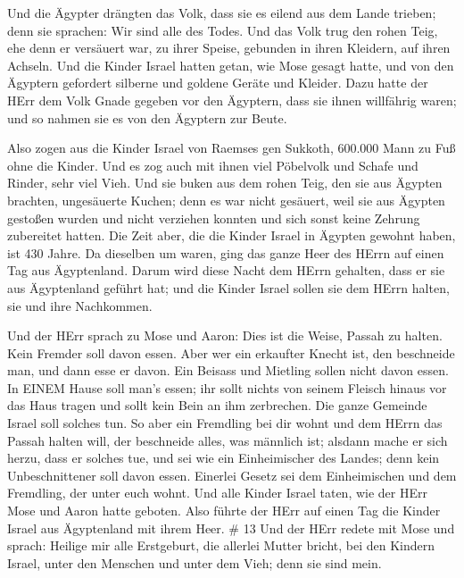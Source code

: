  Und die Ägypter drängten das Volk, dass sie es eilend aus
dem Lande trieben; denn sie sprachen: Wir sind alle des Todes.
 Und das Volk trug den rohen Teig, ehe denn er versäuert
war, zu ihrer Speise, gebunden in ihren Kleidern, auf ihren Achseln.
 Und die Kinder Israel hatten getan, wie Mose gesagt hatte,
und von den Ägyptern gefordert silberne und goldene Geräte und Kleider.
 Dazu hatte der HErr dem Volk Gnade gegeben vor den
Ägyptern, dass sie ihnen willfährig waren; und so nahmen sie es von den
Ägyptern zur Beute.

 Also zogen aus die Kinder Israel von Raemses gen Sukkoth,
600.000 Mann zu Fuß ohne die Kinder.  Und es zog auch mit
ihnen viel Pöbelvolk und Schafe und Rinder, sehr viel Vieh.
 Und sie buken aus dem rohen Teig, den sie aus Ägypten
brachten, ungesäuerte Kuchen; denn es war nicht gesäuert, weil sie aus
Ägypten gestoßen wurden und nicht verziehen konnten und sich sonst keine
Zehrung zubereitet hatten.  Die Zeit aber, die die Kinder
Israel in Ägypten gewohnt haben, ist 430 Jahre.  Da
dieselben um waren, ging das ganze Heer des HErrn auf einen Tag aus
Ägyptenland.  Darum wird diese Nacht dem HErrn gehalten,
dass er sie aus Ägyptenland geführt hat; und die Kinder Israel sollen
sie dem HErrn halten, sie und ihre Nachkommen.

 Und der HErr sprach zu Mose und Aaron: Dies ist die Weise,
Passah zu halten. Kein Fremder soll davon essen.  Aber wer
ein erkaufter Knecht ist, den beschneide man, und dann esse er davon.
 Ein Beisass und Mietling sollen nicht davon essen.
 In EINEM Hause soll man's essen; ihr sollt nichts von
seinem Fleisch hinaus vor das Haus tragen und sollt kein Bein an ihm
zerbrechen.  Die ganze Gemeinde Israel soll solches tun.
 So aber ein Fremdling bei dir wohnt und dem HErrn das
Passah halten will, der beschneide alles, was männlich ist; alsdann
mache er sich herzu, dass er solches tue, und sei wie ein Einheimischer
des Landes; denn kein Unbeschnittener soll davon essen. 
Einerlei Gesetz sei dem Einheimischen und dem Fremdling, der unter euch
wohnt.  Und alle Kinder Israel taten, wie der HErr Mose und
Aaron hatte geboten.  Also führte der HErr auf einen Tag
die Kinder Israel aus Ägyptenland mit ihrem Heer. \# 13  Und
der HErr redete mit Mose und sprach:  Heilige mir alle
Erstgeburt, die allerlei Mutter bricht, bei den Kindern Israel, unter
den Menschen und unter dem Vieh; denn sie sind mein.

